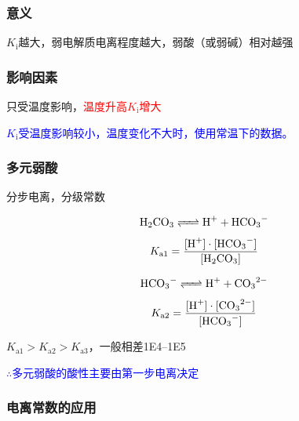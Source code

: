         \subsubsection{意义}\label{subsubsec:电离常数的意义}

            \(K_\text{i}\)越大，弱电解质电离程度越大，弱酸（或弱碱）相对越强

        \subsubsection{影响因素}\label{subsubsec:影响电离常数的因素}

            只受温度影响，\textcolor{red}{温度升高\(K_\text{i}\)增大}

            \textcolor{blue}{\(K_\text{i}\)受温度影响较小，温度变化不大时，使用常温下的数据。}
            
        \subsubsection{多元弱酸}\label{subsubsec:多元弱酸的电离常数}

            分步电离，分级常数

            \vspace{-\baselineskip}
            \begin{minipage}{0.45\textwidth}
                \[\cemh{H2CO3 <=> H+ + HCO3^-}\]
            \vspace{-\baselineskip}
                \[K_\text{a1}=\frac{\cemh{[H+]}\cdot\cemh{[HCO3^-]}}{\cemh{[H2CO3]}}\]
            \end{minipage}
            \hfil
            \begin{minipage}{0.45\textwidth}
                \[\cemh{HCO3^- <=> H+ + CO3^{2-}}\]
            \vspace{-\baselineskip}
                \[K_\text{a2}=\frac{\cemh{[H+]}\cdot\cemh{[CO3^{2-}]}}{\cemh{[HCO3^-]}}\]
            \end{minipage}

            \(K_\text{a1}>K_\text{a2}>K_\text{a3}\)，一般相差\numrange{1E4}{1E5}

            \textcolor{blue}{\(\therefore\)多元弱酸的酸性主要由第一步电离决定}
        
        \subsubsection{电离常数的应用}\label{subsubsec:电离常数的应用}

